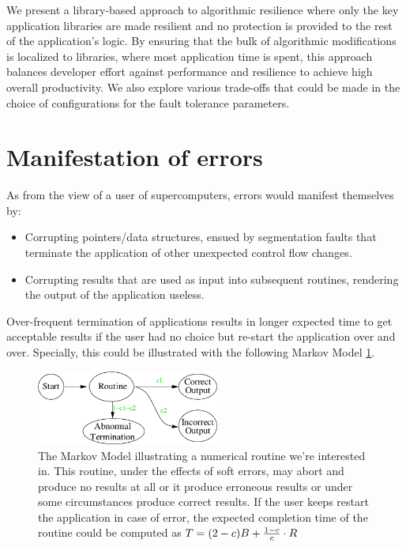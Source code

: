 \documentclass{article}
\begin{document}
We present a library-based approach to algorithmic
resilience where only the key application libraries are made
resilient and no protection is provided to the rest of the
application’s logic. By ensuring that the bulk of algorithmic
modifications is localized to libraries, where most application
time is spent, this approach balances developer effort against
performance and resilience to achieve high overall
productivity. We also explore various trade-offs that could be made in the choice of configurations for the fault tolerance parameters.


\section{Manifestation of errors}

As from the view of a user of supercomputers, errors would manifest themselves by:
\begin{itemize}
\item{Corrupting pointers/data structures, ensued by segmentation faults that terminate the application of other unexpected control flow changes.}
\item{Corrupting results that are used as input into subsequent routines, rendering the output of the application useless.}
\end{itemize}

Over-frequent termination of applications results in longer expected time to get acceptable results if the user had no choice but re-start the application over and over. Specially, this could be illustrated with the following Markov Model \ref{markovModel}.

\begin{figure}
\includegraphics[width=6cm]{routine_markov.png}
\caption{The Markov Model illustrating a numerical routine we're interested in. This routine, under the effects of soft errors, may abort and produce no results at all or it produce erroneous results or under some circumstances produce correct results. If the user keeps restart the application in case of error, the expected completion time of the routine could be computed as $T=(2-c)B+{{1-c} \over {c}} \cdot R$}
\label{markovModel}
\end{figure}
\end{document}
